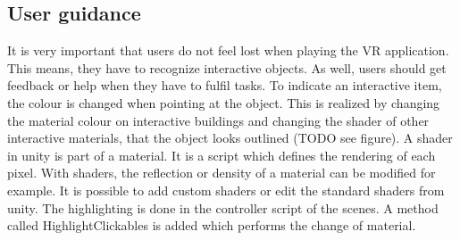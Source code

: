 \subsection{User guidance}
It is very important that users do not feel lost when playing the VR application. This means, they have to recognize interactive objects.  As well, users should get feedback or help when they have to fulfil tasks. To indicate an interactive item, the colour is changed when pointing at the object. This is realized by changing the material colour on interactive buildings and changing the shader of other interactive materials, that the object looks outlined (TODO see figure). A shader in unity is part of a material. It is a script which defines the rendering of each pixel. With shaders, the reflection or density of a material can be modified for example. It is possible to add custom shaders or edit the standard shaders from unity. The highlighting is done in the controller script of the scenes. A method called HighlightClickables is added which performs the change of material.
